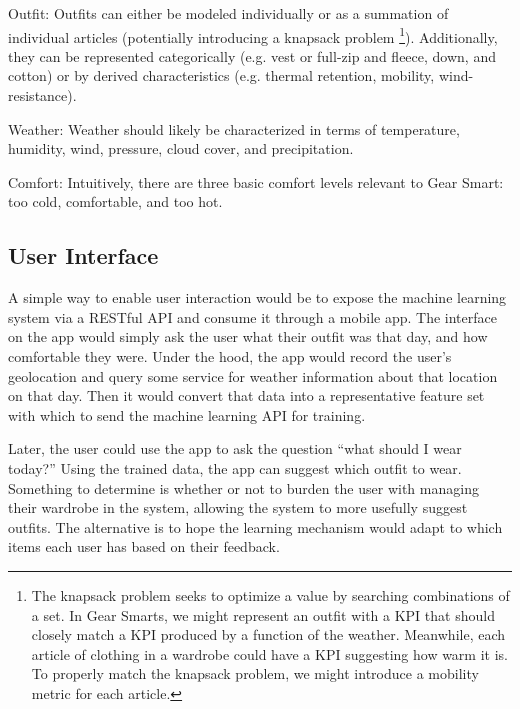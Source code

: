 \begin{description}
  \item{Outfit:} Outfits can either be modeled individually or as a summation of individual articles (potentially introducing
  a knapsack problem \footnote{The knapsack problem seeks to optimize a value by searching combinations of a set. In Gear Smarts,
  we might represent an outfit with a KPI that should closely match a KPI produced by a function of the weather. Meanwhile, each
  article of clothing in a wardrobe could have a KPI suggesting how warm it is. To properly match the knapsack problem, we might
  introduce a mobility metric for each article.}). Additionally, they can be represented categorically (e.g. vest or full-zip and
  fleece, down, and cotton) or by derived characteristics (e.g. thermal retention, mobility, wind-resistance).
  \item{Weather:} Weather should likely be characterized in terms of temperature, humidity, wind, pressure,
  cloud cover, and precipitation.
  \item{Comfort:} Intuitively, there are three basic comfort levels relevant to Gear Smart: too cold, comfortable, and too hot.
\end{description}

\subsection{User Interface}
A simple way to enable user interaction would be to expose the machine learning system via a RESTful API and consume it
through a mobile app. The interface on the app would simply ask the user what their outfit was that day, and how comfortable
they were. Under the hood, the app would record the user's geolocation and query some service for weather information
about that location on that day. Then it would convert that data into a representative feature set with which to send
the machine learning API for training.

Later, the user could use the app to ask the question ``what should I wear today?'' Using the trained data, the app can
suggest which outfit to wear. Something to determine is whether or not to burden the user with managing
their wardrobe in the system, allowing the system to more usefully suggest outfits. The alternative is to hope the
learning mechanism would adapt to which items each user has based on their feedback.
